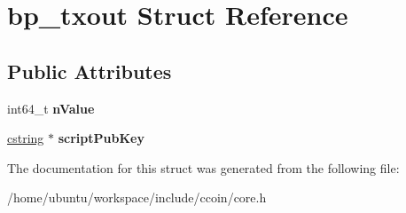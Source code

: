\hypertarget{structbp__txout}{\section{bp\-\_\-txout Struct Reference}
\label{structbp__txout}
}
\subsection*{Public Attributes}
\begin{DoxyCompactItemize}
\item 
\hypertarget{structbp__txout_ab9fa494d2df2009d65f851eefa524e9a}{int64\-\_\-t {\bfseries n\-Value}}\label{structbp__txout_ab9fa494d2df2009d65f851eefa524e9a}

\item 
\hypertarget{structbp__txout_a4122c6f617be14d4ce631a03b8b3c94f}{\hyperlink{structcstring}{cstring} $\ast$ {\bfseries script\-Pub\-Key}}\label{structbp__txout_a4122c6f617be14d4ce631a03b8b3c94f}

\end{DoxyCompactItemize}


The documentation for this struct was generated from the following file\-:\begin{DoxyCompactItemize}
\item 
/home/ubuntu/workspace/include/ccoin/core.\-h\end{DoxyCompactItemize}

